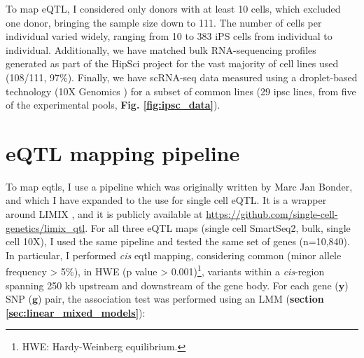  
To map eQTL, I considered only donors with at least 10 cells, which excluded one donor, bringing the sample size down to 111.
The number of cells per individual varied widely, ranging from 10 to 383 iPS cells from individual to individual.
Additionally, we have matched bulk RNA-sequencing profiles generated as part of the HipSci project \cite{kilpinen2017common} for the vast majority of cell lines used (108/111, 97\%). 
Finally, we have scRNA-seq data measured using a droplet-based technology (10X Genomics \cite{zheng2017massively}) for a subset of common lines (29 \gls{ipsc} lines, from five of the experimental pools, \textbf{Fig. \ref{fig:ipsc_data}}). 

\section{eQTL mapping pipeline}

To map \glspl{eqtl}, I use a pipeline which was originally written by Marc Jan Bonder, and which I have expanded to the use for single cell eQTL. 
It is a wrapper around LIMIX \cite{lippert2014limix, casale2015efficient}, and it is publicly available at \url{https://github.com/single-cell-genetics/limix_qtl}. 
For all three eQTL maps (single cell SmartSeq2, bulk, single cell 10X), I used the same pipeline and tested the same set of genes (n=10,840). 
In particular, I performed \textit{cis} \gls{eqtl} mapping, considering common (minor allele frequency > 5\%), in HWE (p value > 0.001)\footnote{HWE: Hardy-Weinberg equilibrium.}, variants within a \textit{cis}-region spanning 250 kb upstream and downstream of the gene body.
For each gene ($\mathbf{y}$) SNP ($\mathbf{g}$) pair, the association test was performed using an LMM (\textbf{section \ref{sec:linear_mixed_models}}):

